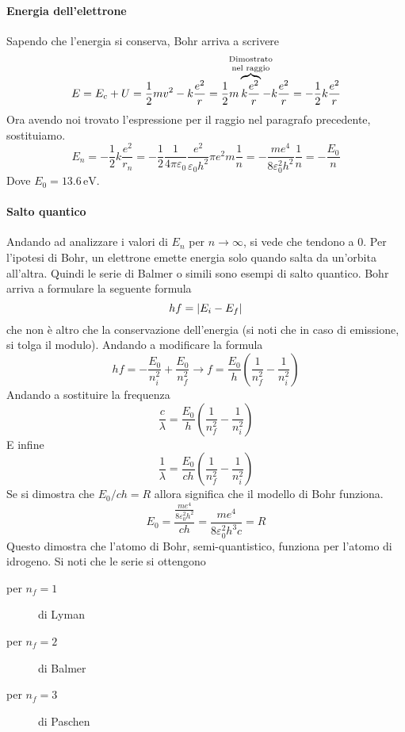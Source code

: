 \paragraph{Energia dell'elettrone}
Sapendo che l'energia si conserva, Bohr arriva a scrivere
\begin{equation*}
  E = E_c + U = \frac{1}{2}mv^2-k \frac{e^2}{r} = 
  \frac{1}{2}m\overbrace{k\frac{e^2}{r}}^{\mathclap{\text{\parbox{4cm}{\centering Dimostrato \\[-4pt]
  nel raggio}}}}-k \frac{e^2}{r} = -\frac{1}{2}k \frac{e^2}{r}
\end{equation*}
Ora avendo noi trovato l'espressione per il raggio nel paragrafo precedente, sostituiamo.
\begin{equation*}
  E_n=-\frac{1}{2}k \frac{e^2}{r_n}=-\frac{1}{2}\frac{1}{4\pi\varepsilon_0}
  \frac{e^2}{\varepsilon_0h^2}\pi e^2m\frac{1}{n}=
  -\frac{me^4}{8\varepsilon_0^2h^2}\frac{1}{n}= -\frac{E_0}{n}
\end{equation*}
Dove $E_0 = 13.6\,\text{eV}$.\\
\paragraph{Salto quantico}
Andando ad analizzare i valori di $E_n$ per $n\to\infty$, si vede che tendono a $0$. Per l'ipotesi
di Bohr, un elettrone emette energia solo quando salta da un'orbita all'altra. Quindi le serie
di Balmer o simili sono esempi di salto quantico. Bohr arriva a formulare la seguente formula
\begin{equation*}
 hf = \lvert E_i-E_f\rvert
\end{equation*}
che non è altro che la conservazione dell'energia (si noti che in caso di emissione, si tolga il
modulo). Andando a modificare la formula
\begin{equation*}
  hf=-\frac{E_0}{n_i^2}+\frac{E_0}{n_f^2} \rightarrow f = 
  \frac{E_0}{h}\left( \frac{1}{n_f^2}-\frac{1}{n_i^2} \right)
\end{equation*}
Andando a sostituire la frequenza
\begin{equation*}
  \frac{c}{\lambda}=\frac{E_0}{h}\left( \frac{1}{n_f^2}-\frac{1}{n_i^2} \right)
\end{equation*}
E infine
\begin{equation*}
  \frac{1}{\lambda}=\frac{E_0}{ch}\left( \frac{1}{n_f^2}-\frac{1}{n_i^2} \right)
\end{equation*}
Se si dimostra che $E_0/ch = R$ allora significa che il modello di Bohr funziona.
\begin{equation*}
  E_0= \frac{\frac{me^4}{8\varepsilon_0^2h^2}}{ch}= \frac{me^4}{8\varepsilon_0^2h^3c}=R
\end{equation*}
Questo dimostra che l'atomo di Bohr, semi-quantistico, funziona per l'atomo di idrogeno. Si noti che
le serie si ottengono
\begin{description}
  \item[per $n_f=1$] di Lyman
  \item[per $n_f=2$] di Balmer
  \item[per $n_f=3$] di Paschen
\end{description}
